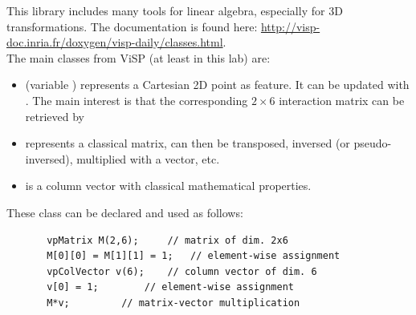 \documentclass{ecnreport}
\begin{document}
This library includes many tools for linear algebra, especially for 3D transformations. 
The documentation is found here: \url{http://visp-doc.inria.fr/doxygen/visp-daily/classes.html}.\\
The main classes from ViSP (at least in this lab) are:
\begin{itemize}
\item {} (variable ) represents a Cartesian 2D point as feature. It can be updated with . The main interest is that the corresponding $2\times 6$ interaction matrix can be retrieved by 
\item {} represents a classical matrix, can then be transposed, inversed (or pseudo-inversed), multiplied with a vector, etc.
\item {} is a column vector with classical mathematical properties.
\end{itemize}
These class can be declared and used as follows:
\begin{center}\cppstyle
\begin{lstlisting}
       vpMatrix M(2,6); 	// matrix of dim. 2x6
       M[0][0] = M[1][1] = 1;	// element-wise assignment
       vpColVector v(6);	// column vector of dim. 6
       v[0] = 1;		// element-wise assignment
       M*v;			// matrix-vector multiplication
\end{lstlisting}
\end{center}
%
%
\end{document}
